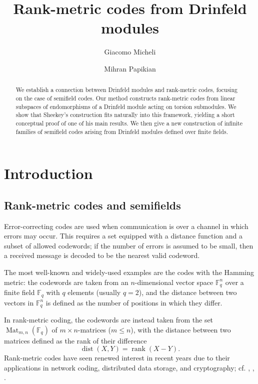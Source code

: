 \documentclass[12pt]{amsart}
\title{Rank-metric codes from Drinfeld modules}
\author{Giacomo Micheli}
\author{Mihran Papikian}
\theoremstyle{definition}
\theoremstyle{remark}
\numberwithin{equation}{section}
\numberwithin{thm}{section}
\DeclareMathOperator{\dist}{dist}
\DeclareMathOperator{\rank}{rank}
\DeclareMathOperator{\Mat}{Mat}
\newcommand{\F}{\mathbb{F}}
\begin{document}
	


\begin{abstract}
We establish a connection between Drinfeld modules and rank-metric codes, focusing  
on the case of semifield codes. 
Our method constructs rank-metric codes from linear subspaces of endomorphisms of a 
Drinfeld module acting on torsion submodules. We show that Sheekey's construction \cite{Sheekey} 
fits naturally into this framework, yielding a short conceptual proof of one of his main results. 
We then give a new construction of infinite families of semifield codes arising from 
Drinfeld modules defined over finite fields.
\end{abstract}


\maketitle
\section{Introduction} 

\subsection{Rank-metric codes and semifields}\label{ss1.1} Error-correcting codes are used when communication is over a channel in which 
errors may occur. This requires a set equipped with a distance function and a subset of allowed codewords; if the number of errors 
is assumed to be small, then a received message is decoded to be the nearest valid codeword. 

The most well-known and widely-used examples are the codes with the Hamming metric: the codewords are taken from an $n$-dimensional vector 
space $\F_q^n$ over a finite field $\F_q$ with $q$ elements (usually $q=2$), and the distance between two vectors in $\F_q^n$ 
is defined as the number of positions in which they differ.  

In rank-metric coding, the codewords are instead taken from the set $\Mat_{m, n}(\F_q)$  of $m\times n$-matrices ($m\leq n$), with 
the distance between two matrices defined as the rank of their difference 
$$
\dist(X, Y) = \rank (X-Y). 
$$
Rank-metric codes have seen renewed interest in recent years due to their applications in network coding, distributed
data storage,  
and cryptography; cf. \cite{SKK}, \cite{bartz2022}, \cite{SheekeySurvey}. 
\end{document}
